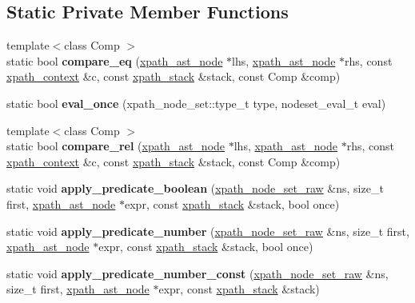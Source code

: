 \subsection*{Static Private Member Functions}
\begin{DoxyCompactItemize}
\item 
\mbox{\label{classxpath__ast__node_a98dd7f6e67fe2c56c63056eed835d6a4}} 
{\footnotesize template$<$class Comp $>$ }\\static bool {\bfseries compare\+\_\+eq} (\hyperlink{classxpath__ast__node}{xpath\+\_\+ast\+\_\+node} $\ast$lhs, \hyperlink{classxpath__ast__node}{xpath\+\_\+ast\+\_\+node} $\ast$rhs, const \hyperlink{structxpath__context}{xpath\+\_\+context} \&c, const \hyperlink{structxpath__stack}{xpath\+\_\+stack} \&stack, const Comp \&comp)
\item 
\mbox{\label{classxpath__ast__node_a35ad012fc33cf3dc51468a67c04aac54}} 
static bool {\bfseries eval\+\_\+once} (xpath\+\_\+node\+\_\+set\+::type\+\_\+t type, nodeset\+\_\+eval\+\_\+t eval)
\item 
\mbox{\label{classxpath__ast__node_abb6e4c529276eaf882233dbb6e04e111}} 
{\footnotesize template$<$class Comp $>$ }\\static bool {\bfseries compare\+\_\+rel} (\hyperlink{classxpath__ast__node}{xpath\+\_\+ast\+\_\+node} $\ast$lhs, \hyperlink{classxpath__ast__node}{xpath\+\_\+ast\+\_\+node} $\ast$rhs, const \hyperlink{structxpath__context}{xpath\+\_\+context} \&c, const \hyperlink{structxpath__stack}{xpath\+\_\+stack} \&stack, const Comp \&comp)
\item 
\mbox{\label{classxpath__ast__node_ab4e5bbd3f2e83c86a43349374b4bfc22}} 
static void {\bfseries apply\+\_\+predicate\+\_\+boolean} (\hyperlink{classxpath__node__set__raw}{xpath\+\_\+node\+\_\+set\+\_\+raw} \&ns, size\+\_\+t first, \hyperlink{classxpath__ast__node}{xpath\+\_\+ast\+\_\+node} $\ast$expr, const \hyperlink{structxpath__stack}{xpath\+\_\+stack} \&stack, bool once)
\item 
\mbox{\label{classxpath__ast__node_abf2d4b745493f63aebc1c89d9fde8eed}} 
static void {\bfseries apply\+\_\+predicate\+\_\+number} (\hyperlink{classxpath__node__set__raw}{xpath\+\_\+node\+\_\+set\+\_\+raw} \&ns, size\+\_\+t first, \hyperlink{classxpath__ast__node}{xpath\+\_\+ast\+\_\+node} $\ast$expr, const \hyperlink{structxpath__stack}{xpath\+\_\+stack} \&stack, bool once)
\item 
\mbox{\label{classxpath__ast__node_a8cedd7e15623b9fa431788b8843f1463}} 
static void {\bfseries apply\+\_\+predicate\+\_\+number\+\_\+const} (\hyperlink{classxpath__node__set__raw}{xpath\+\_\+node\+\_\+set\+\_\+raw} \&ns, size\+\_\+t first, \hyperlink{classxpath__ast__node}{xpath\+\_\+ast\+\_\+node} $\ast$expr, const \hyperlink{structxpath__stack}{xpath\+\_\+stack} \&stack)
\end{DoxyCompactItemize}
